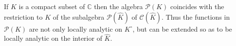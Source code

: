 If $K$ is a compact subset of $\mathbb{C}$ then the algebra $\mathcal{P}(K)$ coincides with the restriction to $K$ of the subalgebra $\mathcal{P}(\hat{K})$ of $\mathcal{C}(\hat{K})$. Thus the functions in $\mathcal{P}(K)$ are not only locally analytic on $K^{\circ}$, but can be extended so as to be locally analytic on the interior of $\hat{K}$.
